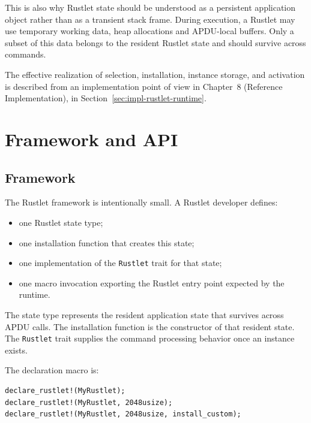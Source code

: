 This is also why Rustlet state should be understood as a persistent
application object rather than as a transient stack frame. During
execution, a Rustlet may use temporary working data, heap allocations
and APDU-local buffers. Only a subset of this data belongs to the
resident Rustlet state and should survive across commands.


The effective realization of selection, installation, instance storage,
and activation is described from an implementation point of view in
Chapter~8 (Reference Implementation), in
Section~\ref{sec:impl-rustlet-runtime}.

\section{Framework and API}

\subsection{Framework}

The Rustlet framework is intentionally small. A Rustlet developer
defines:
\begin{itemize}
\item one Rustlet state type;
\item one installation function that creates this state;
\item one implementation of the \texttt{Rustlet} trait for that state;
\item one macro invocation exporting the Rustlet entry point expected by
  the runtime.
\end{itemize}

The state type represents the resident application state that survives
across APDU calls. The installation function is the constructor of that
resident state. The \texttt{Rustlet} trait supplies the command
processing behavior once an instance exists.

The declaration macro is:
\begin{verbatim}
declare_rustlet!(MyRustlet);
declare_rustlet!(MyRustlet, 2048usize);
declare_rustlet!(MyRustlet, 2048usize, install_custom);
\end{verbatim}


